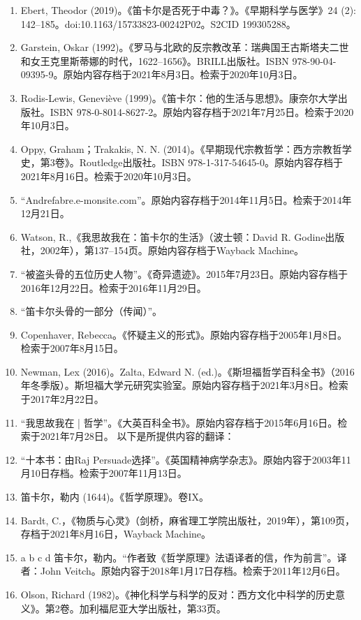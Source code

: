 \begin{enumerate}
\item Ebert, Theodor (2019)。《笛卡尔是否死于中毒？》。《早期科学与医学》24 (2): 142–185。doi:10.1163/15733823-00242P02。S2CID 199305288。
\item Garstein, Oskar (1992)。《罗马与北欧的反宗教改革：瑞典国王古斯塔夫二世和女王克里斯蒂娜的时代，1622–1656》。BRILL出版社。ISBN 978-90-04-09395-9。原始内容存档于2021年8月3日。检索于2020年10月3日。
\item Rodis-Lewis, Geneviève (1999)。《笛卡尔：他的生活与思想》。康奈尔大学出版社。ISBN 978-0-8014-8627-2。原始内容存档于2021年7月25日。检索于2020年10月3日。
\item Oppy, Graham；Trakakis, N. N. (2014)。《早期现代宗教哲学：西方宗教哲学史，第3卷》。Routledge出版社。ISBN 978-1-317-54645-0。原始内容存档于2021年8月16日。检索于2020年10月3日。
\item “Andrefabre.e-monsite.com”。原始内容存档于2014年11月5日。检索于2014年12月21日。
\item Watson, R.,《我思故我在：笛卡尔的生活》（波士顿：David R. Godine出版社，2002年），第137–154页。原始内容存档于Wayback Machine。
\item “被盗头骨的五位历史人物”。《奇异遗迹》。2015年7月23日。原始内容存档于2016年12月22日。检索于2016年11月29日。
\item “笛卡尔头骨的一部分（传闻）”。
\item Copenhaver, Rebecca。《怀疑主义的形式》。原始内容存档于2005年1月8日。检索于2007年8月15日。
\item Newman, Lex (2016)。Zalta, Edward N. (ed.)。《斯坦福哲学百科全书》（2016年冬季版）。斯坦福大学元研究实验室。原始内容存档于2021年3月8日。检索于2017年2月22日。
\item “我思故我在 | 哲学”。《大英百科全书》。原始内容存档于2015年6月16日。检索于2021年7月28日。
以下是所提供内容的翻译：
\item “十本书：由Raj Persuade选择”。《英国精神病学杂志》。原始内容于2003年11月10日存档。检索于2007年11月13日。
\item 笛卡尔，勒内 (1644)。《哲学原理》。卷IX。
\item Bardt, C.，《物质与心灵》（剑桥，麻省理工学院出版社，2019年），第109页，存档于2021年8月16日，Wayback Machine。
\item a b c d 笛卡尔，勒内。“作者致《哲学原理》法语译者的信，作为前言”。译者：John Veitch。原始内容于2018年1月17日存档。检索于2011年12月6日。
\item Olson, Richard (1982)。《神化科学与科学的反对：西方文化中科学的历史意义》。第2卷。加利福尼亚大学出版社，第33页。

\end{enumerate}
